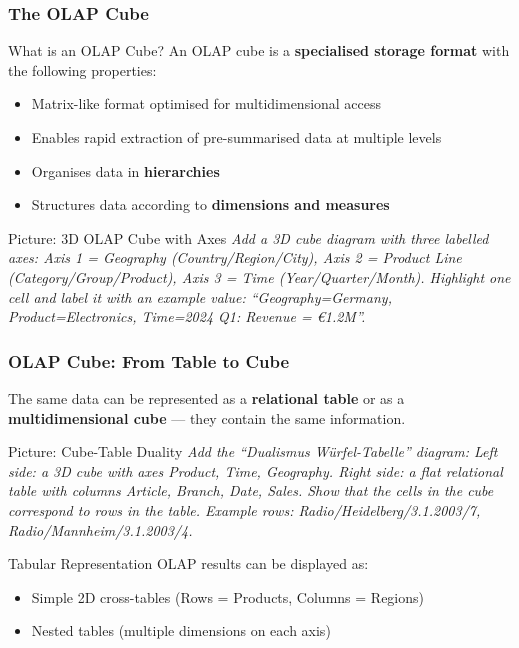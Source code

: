\begin{frame}
  \frametitle{The OLAP Cube}

  \begin{block}{What is an OLAP Cube?}
    An OLAP cube is a \textbf{specialised storage format} with the following properties:
    \begin{itemize}
      \item Matrix-like format optimised for multidimensional access
      \item Enables rapid extraction of pre-summarised data at multiple levels
      \item Organises data in \textbf{hierarchies}
      \item Structures data according to \textbf{dimensions and measures}
    \end{itemize}
  \end{block}

  \begin{alertblock}{Picture: 3D OLAP Cube with Axes}
    \textit{Add a 3D cube diagram with three labelled axes:
    Axis 1 = Geography (Country/Region/City),
    Axis 2 = Product Line (Category/Group/Product),
    Axis 3 = Time (Year/Quarter/Month).
    Highlight one cell and label it with an example value:
    ``Geography=Germany, Product=Electronics, Time=2024 Q1: Revenue = \euro{}1.2M''.}
  \end{alertblock}
\end{frame}

\begin{frame}
  \frametitle{OLAP Cube: From Table to Cube}

  The same data can be represented as a \textbf{relational table} or
  as a \textbf{multidimensional cube} --- they contain the same information.

  \begin{alertblock}{Picture: Cube-Table Duality}
    \textit{Add the ``Dualismus Würfel-Tabelle'' diagram:
    Left side: a 3D cube with axes Product, Time, Geography.
    Right side: a flat relational table with columns Article, Branch, Date, Sales.
    Show that the cells in the cube correspond to rows in the table.
    Example rows: Radio/Heidelberg/3.1.2003/7, Radio/Mannheim/3.1.2003/4.}
  \end{alertblock}

  \begin{block}{Tabular Representation}
    OLAP results can be displayed as:
    \begin{itemize}
      \item Simple 2D cross-tables (Rows = Products, Columns = Regions)
      \item Nested tables (multiple dimensions on each axis)
    \end{itemize}
  \end{block}
\end{frame}

